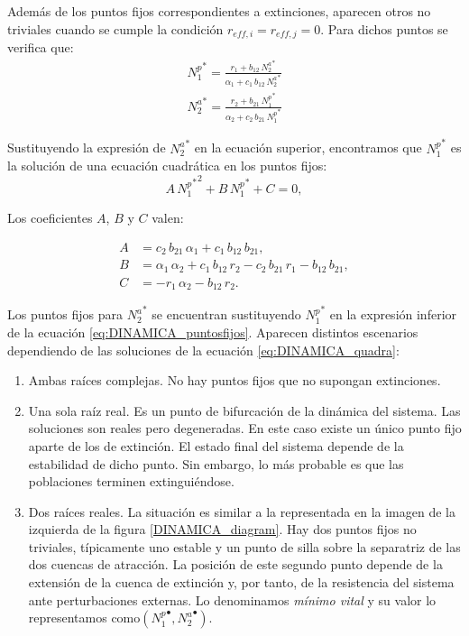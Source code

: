 Además de los puntos fijos correspondientes a extinciones, aparecen otros no triviales cuando se cumple la condición $r_{eff,i} = r_{eff,j} = 0$. Para dichos puntos se verifica que: 
\begin{align}
{N^p_{1}}^* = \frac{ r_{1}+ b_{12} \, {N^a_{2}}^* }{\alpha_{1}+ c_{1}\, b_{12}\, {N^a_{2}}^* } \nonumber\\ 
{N^a_{2}}^* = \frac{ r_{2}+ b_{21}\, {N^p_{1}}^* }{\alpha_{2}+ c_{2} \, b_{21}\, {N^p_{1}}^* } 
\label{eq:DINAMICA_puntosfijos}
\end{align}

Sustituyendo la expresión de ${N^{a}_2}^*$ en la ecuación superior, encontramos que ${N^p_1}^*$ es la solución de una ecuación cuadrática en los puntos fijos: 
\begin{equation}
A\, {{N^p_1}^*}^2 + B \, {N^p_1}^* + C=0 ,
\label{eq:DINAMICA_quadra}
\end{equation}

Los coeficientes $A$, $B$ y $C$ valen:

\begin{align}
\displaystyle A &= c_{2}\, b_{21}\, \alpha_{1}+c_{1}\, b_{12}\, b_{21} , \nonumber \\
\displaystyle B &= \alpha_{1}\, \alpha_{2}+ c_{1}\, b_{12}\, r_{2} - c_{2}\, b_{21}\, r_{1} - b_{12}\, b_{21} ,\nonumber\\
\displaystyle C &= - r _{1}\, \alpha_{2} - b_{12}\, r_{2} .
\label{eq:DINAMICA_puntos_n1}
\end{align}

Los puntos fijos para ${N^a_2}^*$ se encuentran sustituyendo ${N^p_1}^*$ en la expresión inferior de la ecuación \ref{eq:DINAMICA_puntosfijos}. Aparecen distintos escenarios dependiendo de las soluciones de la ecuación \ref{eq:DINAMICA_quadra}:

\begin{enumerate}
\item Ambas raíces complejas. No hay puntos fijos que no supongan extinciones.
\item Una sola raíz real. Es un punto de bifurcación de la dinámica del sistema. Las soluciones son reales pero degeneradas. En este caso existe un único punto fijo aparte de los de extinción. El estado final del sistema depende de la estabilidad de dicho punto. Sin embargo, lo más probable es que las poblaciones terminen extinguiéndose.
\item Dos raíces reales. La situación es similar a la representada en la imagen de la izquierda de la figura \ref{DINAMICA_diagram}. Hay dos puntos fijos no triviales, típicamente uno estable y un punto de silla sobre la separatriz de las dos cuencas de atracción. La posición de este segundo punto depende de la extensión de la cuenca de extinción y, por tanto, de la resistencia del sistema ante perturbaciones externas. Lo denominamos \textit{mínimo vital} y su valor lo representamos como$({N_{1}^{p}}^\bullet,{N_{2}^{a}}^\bullet)$.
\end{enumerate}

